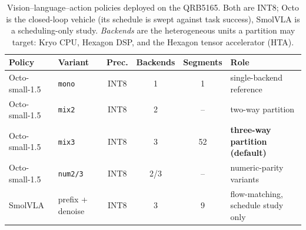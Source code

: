 
\begin{table}[t]
\centering
\caption{Vision--language--action policies deployed on the QRB5165.  Both are
INT8; Octo is the closed-loop vehicle (its schedule is swept against task
success), SmolVLA is a scheduling-only study.  \emph{Backends} are the
heterogeneous units a partition may target: Kryo CPU, Hexagon DSP, and the
Hexagon tensor accelerator (HTA).}
\label{tab:models}
\small
\begin{tabular}{llcccl}
\toprule
Policy & Variant & Prec. & Backends & Segments & Role \\
\midrule
Octo-small-1.5 & \texttt{mono}  & INT8 & 1 & 1  & single-backend reference \\
Octo-small-1.5 & \texttt{mix2}  & INT8 & 2 & -- & two-way partition \\
Octo-small-1.5 & \texttt{mix3}  & INT8 & 3 & 52 & \textbf{three-way partition (default)} \\
Octo-small-1.5 & \texttt{num2/3}& INT8 & 2/3 & -- & numeric-parity variants \\
\addlinespace
SmolVLA        & prefix + denoise & INT8 & 3 & 9 & flow-matching, schedule study only \\
\bottomrule
\end{tabular}
\end{table}

